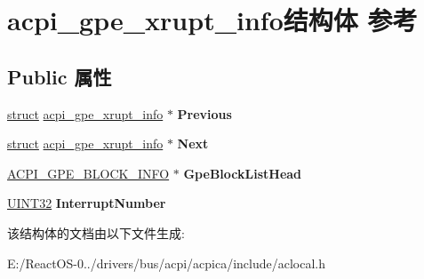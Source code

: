 \hypertarget{structacpi__gpe__xrupt__info}{}\section{acpi\+\_\+gpe\+\_\+xrupt\+\_\+info结构体 参考}
\label{structacpi__gpe__xrupt__info}
\subsection*{Public 属性}
\begin{DoxyCompactItemize}
\item 
\mbox{\label{structacpi__gpe__xrupt__info_a1534684ebb5f5ccc22acfc5e4d60cee6}} 
\hyperlink{interfacestruct}{struct} \hyperlink{structacpi__gpe__xrupt__info}{acpi\+\_\+gpe\+\_\+xrupt\+\_\+info} $\ast$ {\bfseries Previous}
\item 
\mbox{\label{structacpi__gpe__xrupt__info_a9257f6b486b8d43d6d91a84699e71d80}} 
\hyperlink{interfacestruct}{struct} \hyperlink{structacpi__gpe__xrupt__info}{acpi\+\_\+gpe\+\_\+xrupt\+\_\+info} $\ast$ {\bfseries Next}
\item 
\mbox{\label{structacpi__gpe__xrupt__info_a94a322c1009485ce3b8208fb6c6b319b}} 
\hyperlink{structacpi__gpe__block__info}{A\+C\+P\+I\+\_\+\+G\+P\+E\+\_\+\+B\+L\+O\+C\+K\+\_\+\+I\+N\+FO} $\ast$ {\bfseries Gpe\+Block\+List\+Head}
\item 
\mbox{\label{structacpi__gpe__xrupt__info_a10a8e8732bac696af25e791943f9f3c9}} 
\hyperlink{_processor_bind_8h_ae1e6edbbc26d6fbc71a90190d0266018}{U\+I\+N\+T32} {\bfseries Interrupt\+Number}
\end{DoxyCompactItemize}


该结构体的文档由以下文件生成\+:\begin{DoxyCompactItemize}
\item 
E\+:/\+React\+O\+S-\/0../drivers/bus/acpi/acpica/include/aclocal.\+h\end{DoxyCompactItemize}
